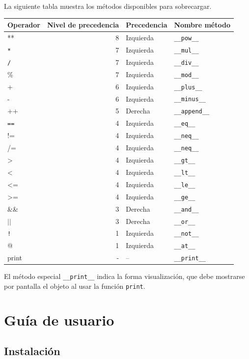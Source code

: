 \documentclass[11pt]{article}
\begin{document}
La siguiente tabla muestra los métodos disponibles para sobrecargar.

\begin{center}
\begin{tabular}{lrll}
Operador & Nivel de precedencia & Precedencia & Nombre método\\
\hline
** & 8 & Izquierda & \texttt{\_\_pow\_\_}\\
\texttt{*} & 7 & Izquierda & \texttt{\_\_mul\_\_}\\
\texttt{/} & 7 & Izquierda & \texttt{\_\_div\_\_}\\
\% & 7 & Izquierda & \texttt{\_\_mod\_\_}\\
+ & 6 & Izquierda & \texttt{\_\_plus\_\_}\\
- & 6 & Izquierda & \texttt{\_\_minus\_\_}\\
++ & 5 & Derecha & \texttt{\_\_append\_\_}\\
\texttt{==} & 4 & Izquierda & \texttt{\_\_eq\_\_}\\
!= & 4 & Izquierda & \texttt{\_\_neq\_\_}\\
/= & 4 & Izquierda & \texttt{\_\_neq\_\_}\\
> & 4 & Izquierda & \texttt{\_\_gt\_\_}\\
< & 4 & Izquierda & \texttt{\_\_lt\_\_}\\
<= & 4 & Izquierda & \texttt{\_\_le\_\_}\\
>= & 4 & Izquierda & \texttt{\_\_ge\_\_}\\
\&\& & 3 & Derecha & \texttt{\_\_and\_\_}\\
\(\vert{} \vert{}\) & 3 & Derecha & \texttt{\_\_or\_\_}\\
\texttt{!} & 1 & Izquierda & \texttt{\_\_not\_\_}\\
@ & 1 & Izquierda & \texttt{\_\_at\_\_}\\
print & - & -- & \texttt{\_\_print\_\_}\\
\end{tabular}
\end{center}


El método especial \texttt{\_\_print\_\_} indica la forma visualización, que debe mostrarse por pantalla el objeto al usar la función \texttt{print}.


\section{Guía de usuario}
\label{sec:org8317ea8}

\subsection{Instalación}
\label{sec:orge637269}
\end{document}
